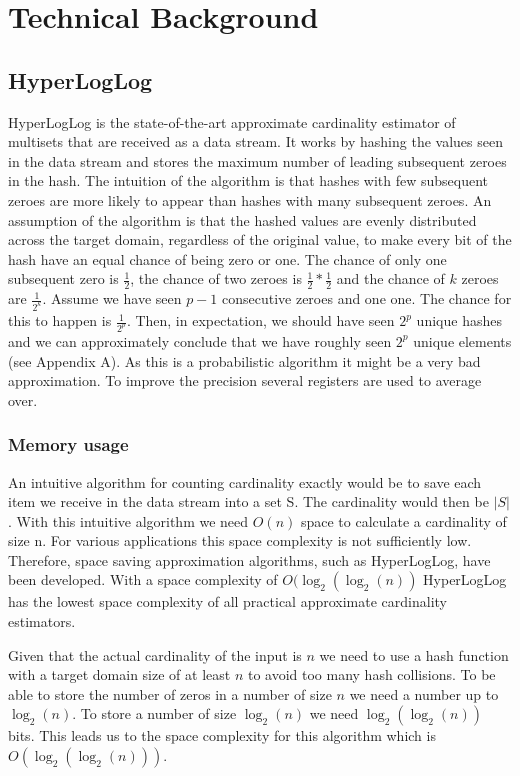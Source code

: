 \chapter{Technical Background}

\section{HyperLogLog}
HyperLogLog is the state-of-the-art approximate cardinality estimator of multisets that are received as a data stream. It works by hashing the values seen in the data stream and stores the maximum number of leading subsequent zeroes in the hash. The intuition of the algorithm is that hashes with few subsequent zeroes are more likely to appear than hashes with many subsequent zeroes. An assumption of the algorithm is that the hashed values are evenly distributed across the target domain, regardless of the original value, to make every bit of the hash have an equal chance of being zero or one. The chance of only one subsequent zero is $\frac{1}{2}$, the chance of two zeroes is $\frac{1}{2}*\frac{1}{2}$ and the chance of $k$ zeroes are $\frac {1} {2^k}$. Assume we have seen $p-1$ consecutive zeroes and one one. The chance for this to happen is $\frac{1}{2^p}$. Then, in expectation, we should have seen $2^p$ unique hashes and we can approximately conclude that we have roughly seen $2^p$ unique elements (see Appendix A). As this is a probabilistic algorithm it might be a very bad approximation. To improve the precision several registers are used to average over. \cite{hyperloglog}

\subsection{Memory usage}
An intuitive algorithm for counting cardinality exactly would be to save each item we receive in the data stream into a set S. The cardinality would then be $|S|$. With this intuitive algorithm we need $O(n)$ space to calculate a cardinality of size n. For various applications this space complexity is not sufficiently low. Therefore, space saving approximation algorithms, such as HyperLogLog, have been developed. With a space complexity of $O(\log_2(\log_2(n))$ HyperLogLog has the lowest space complexity of all practical approximate cardinality estimators. 

Given that the actual cardinality of the input is $n$ we need to use a hash function with a target domain size of at least $n$ to avoid too many hash collisions. To be able to store the number of zeros in a number of size $n$ we need a number up to $\log_2(n)$. To store a number of size $\log_2(n)$ we need $\log_2(\log_2(n))$ bits. This leads us to the space complexity for this algorithm which is $O(\log_2(\log_2(n)))$. \cite{hyperloglog}

